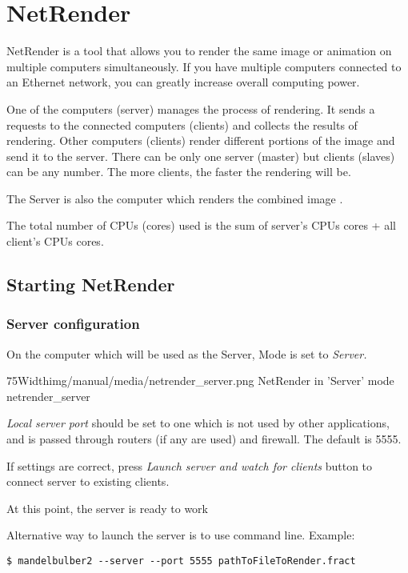 \section{NetRender}\label{netrender}

NetRender is a tool that allows you to render the same image or animation on
multiple computers simultaneously. If you have multiple computers connected to
an Ethernet network, you can greatly increase overall computing power.

One of the computers (server) manages the process of rendering. It sends a
requests to the connected computers (clients) and collects the results of
rendering. Other computers (clients) render different portions of the image and
send it to the server. There can be only one server (master) but clients
(slaves) can be any number. The more clients, the faster the rendering will be.

The Server is also the computer which renders the combined image .

The total number of CPUs (cores) used is the sum of server's CPUs cores + all
client's CPUs cores.

\subsection{Starting NetRender}\label{starting-netrender}

\subsubsection{Server configuration}\label{server-configuration}

On the computer which will be used as the Server, Mode is set to \emph{Server.}

\simpleImageWithCaption75Width{img/manual/media/netrender_server.png}
{NetRender in 'Server' mode}
{netrender_server}

\emph{Local server port} should be set to one which is not used by other
applications, and is passed through routers (if any are used) and firewall. The
default is 5555.

If settings are correct, press \emph{Launch server and watch for clients} button
to connect server to existing clients.

At this point, the server is ready to work

Alternative way to launch the server is to use command line. Example:

\begin{verbatim} 
$ mandelbulber2 --server --port 5555 pathToFileToRender.fract
\end{verbatim}

